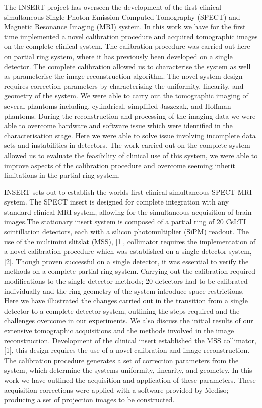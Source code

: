 The INSERT project has overseen the development
of the first clinical simultaneous Single Photon Emission Computed
Tomography (SPECT) and Magnetic Resonance Imaging
(MRI) system. In this work we have for the first time implemented
a novel calibration procedure and acquired tomographic images
on the complete clinical system. The calibration procedure was
carried out here on partial ring system, where it has previously
been developed on a single detector. The complete calibration
allowed us to characterise the system as well as parameterise
the image reconstruction algorithm. The novel system design
requires correction parameters by characterising the uniformity,
linearity, and geometry of the system. We were able to carry
out the tomographic imaging of several phantoms including,
cylindrical, simplified Jaszczak, and Hoffman phantoms. During
the reconstruction and processing of the imaging data we were
able to overcome hardware and software issue which were
identified in the characterisation stage. Here we were able to
solve issue involving incomplete data sets and instabilities in
detectors. The work carried out on the complete system allowed
us to evaluate the feasibility of clinical use of this system, we
were able to improve aspects of the calibration procedure and
overcome seeming inherit limitations in the partial ring system.

INSERT sets out to establish the worlds first clinical simultaneous
SPECT MRI system. The SPECT insert is
designed for complete integration with any standard clinical
MRI system, allowing for the simultaneous acquisition of brain
images.The stationary insert system is composed of a partial
ring of 20 CsI:TI scintillation detectors, each with a silicon
photomultiplier (SiPM) readout. The use of the multimini slitslat
(MSS), [1], collimator requires the implementation of a
novel calibration procedure which was established on a single
detector system, [2]. Though proven successful on a single
detector, it was essential to verify the methods on a complete
partial ring system. Carrying out the calibration required
modifications to the single detector methods; 20 detectors had
to be calibrated individually and the ring geometry of the
system introduce space restrictions. Here we have illustrated
the changes carried out in the transition from a single detector to a complete detector system, outlining the steps required and
the challenges overcome in our experiments. We also discuss
the initial results of our extensive tomographic acquisitions
and the methods involved in the image reconstruction.
Development of the clinical insert established the MSS collimator,
[1], this design requires the use of a novel calibration
and image reconstruction. The calibration procedure generates
a set of correction parameters from the system, which determine
the systems uniformity, linearity, and geometry. In this
work we have outlined the acquisition and application of these
parameters. These acquisition corrections were applied with a
software provided by Mediso; producing a set of projection
images to be constructed.
 
